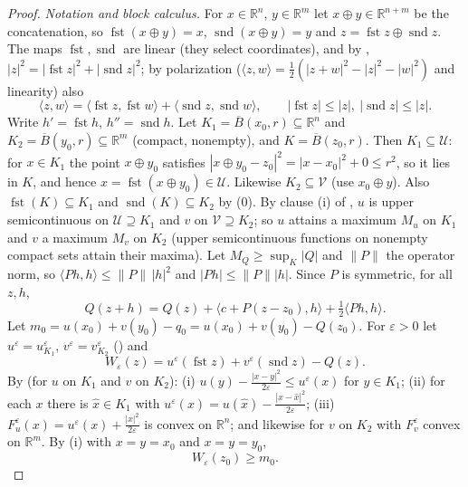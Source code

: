 \begin{proof}
\emph{Notation and block calculus.} For $x\in\mathbb R^n$, $y\in\mathbb R^m$ let $x\oplus y\in\mathbb R^{n+m}$ be the concatenation, so $\operatorname{fst}(x\oplus y)=x$, $\operatorname{snd}(x\oplus y)=y$ and $z=\operatorname{fst}z\oplus\operatorname{snd}z$. The maps $\operatorname{fst},\operatorname{snd}$ are linear (they select coordinates), and by , $|z|^2=|\operatorname{fst}z|^2+|\operatorname{snd}z|^2$; by polarization ($\langle z,w\rangle=\frac12(|z+w|^2-|z|^2-|w|^2)$ and linearity) also
\[
\langle z,w\rangle=\langle\operatorname{fst}z,\operatorname{fst}w\rangle+\langle\operatorname{snd}z,\operatorname{snd}w\rangle ,\qquad |\operatorname{fst}z|\le|z|,\ |\operatorname{snd}z|\le|z|. \tag{0}
\]
Write $h'=\operatorname{fst}h$, $h''=\operatorname{snd}h$. Let $K_1=\overline B(x_0,r)\subseteq\mathbb R^n$ and $K_2=\overline B(y_0,r)\subseteq\mathbb R^m$ (compact, nonempty), and $K=\overline B(z_0,r)$. Then $K_1\subseteq\mathcal U$: for $x\in K_1$ the point $x\oplus y_0$ satisfies $|x\oplus y_0-z_0|^2=|x-x_0|^2+0\le r^2$, so it lies in $K$, and hence $x=\operatorname{fst}(x\oplus y_0)\in\mathcal U$. Likewise $K_2\subseteq\mathcal V$ (use $x_0\oplus y$). Also $\operatorname{fst}(K)\subseteq K_1$ and $\operatorname{snd}(K)\subseteq K_2$ by (0). By clause (i) of , $u$ is upper semicontinuous on $\mathcal U\supseteq K_1$ and $v$ on $\mathcal V\supseteq K_2$; so $u$ attains a maximum $M_u$ on $K_1$ and $v$ a maximum $M_v$ on $K_2$ (upper semicontinuous functions on nonempty compact sets attain their maxima). Let $M_Q\ge\sup_K|Q|$ and $\|P\|$ the operator norm, so $\langle Ph,h\rangle\le\|P\|\,|h|^2$ and $|Ph|\le\|P\||h|$. Since $P$ is symmetric, for all $z,h$,
\[
Q(z+h)=Q(z)+\langle c+P(z-z_0),h\rangle+\tfrac12\langle Ph,h\rangle . \tag{1}
\]
Let $m_0=u(x_0)+v(y_0)-q_0=u(x_0)+v(y_0)-Q(z_0)$. For $\varepsilon>0$ let $u^\varepsilon=u^\varepsilon_{K_1}$, $v^\varepsilon=v^\varepsilon_{K_2}$ () and
\[
W_\varepsilon(z)=u^\varepsilon(\operatorname{fst}z)+v^\varepsilon(\operatorname{snd}z)-Q(z).
\]
By  (for $u$ on $K_1$ and $v$ on $K_2$): (i) $u(y)-\frac{|x-y|^2}{2\varepsilon}\le u^\varepsilon(x)$ for $y\in K_1$; (ii) for each $x$ there is $\hat x\in K_1$ with $u^\varepsilon(x)=u(\hat x)-\frac{|x-\hat x|^2}{2\varepsilon}$; (iii) $F_u^\varepsilon(x)=u^\varepsilon(x)+\frac{|x|^2}{2\varepsilon}$ is convex on $\mathbb R^n$; and likewise for $v$ on $K_2$ with $F_v^\varepsilon$ convex on $\mathbb R^m$. By (i) with $x=y=x_0$ and $x=y=y_0$,
\[
W_\varepsilon(z_0)\ge m_0 . \tag{2}
\]


\end{proof}
